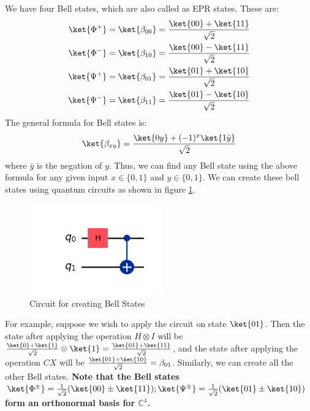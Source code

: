\documentclass[12pt, oneside]{book}
\theoremstyle{definition}
\theoremstyle{definition}
\theoremstyle{remark}
\begin{document}
We have four Bell states, which are also called as EPR states. These are:
\begin{align*}
    \ket{\Phi^+}&=\ket{\beta_{00}}=\frac{\ket{00}+\ket{11}}{\sqrt{2}} \\
    \ket{\Phi^-}&=\ket{\beta_{10}}=\frac{\ket{00}-\ket{11}}{\sqrt{2}} \\
    \ket{\Psi^+}&=\ket{\beta_{01}}=\frac{\ket{01}+\ket{10}}{\sqrt{2}} \\
    \ket{\Psi^-}&=\ket{\beta_{11}}=\frac{\ket{01}-\ket{10}}{\sqrt{2}} \\
\end{align*}
The general formula for Bell states is:
\[
    \ket{\beta_{xy}}=\frac{\ket{0y}+(-1)^x\ket{1\bar{y}}}{\sqrt{2}}
\]
where $\bar{y}$ is the negation of $y$. Thus, we can find any Bell state using the above formula for 
any given input $x \in \{0,1\}$ and $y \in \{0,1\}$.
We can create these bell states using quantum circuits as shown in figure \ref{fig:bell-states}.
\begin{figure}[H]
    \centering
    \includegraphics[width=0.5\textwidth]{../images/bell-states.png}
    \caption{Circuit for creating Bell States}
    \label{fig:bell-states}
\end{figure}
For example, suppose we wish to apply the circuit on state $\ket{01}$. Then the state after applying the
operation $H \otimes I$ will be $\frac{\ket{0}+\ket{1}}{\sqrt{2}}\otimes\ket{1}=\frac{\ket{01}+\ket{11}}{\sqrt{2}}$, and the state after applying the operation $CX$ will be $\frac{\ket{01}+\ket{10}}{\sqrt{2}}=\beta_{01}$. Similarly, we can create all the other Bell states. \textbf{Note that the Bell states $\ket{\Phi^{\pm}}=\frac{1}{\sqrt{2}}(\ket{00} \pm \ket{11}); \ket{\Psi^{\pm}}=\frac{1}{\sqrt{2}}(\ket{01} \pm \ket{10})$ form an orthonormal basis for $\mathbb{C}^4$.}
\end{document}
